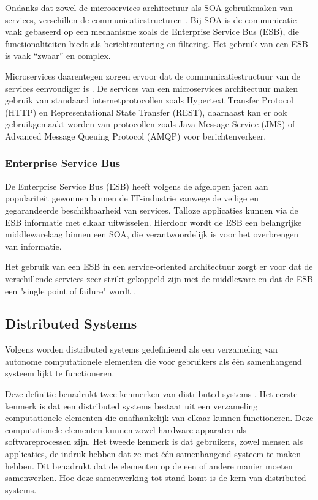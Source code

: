 Ondanks dat zowel de microservices architectuur als SOA gebruikmaken van services, verschillen de communicatiestructuren \autocite{Blinowski2022}. Bij SOA is de communicatie vaak gebaseerd op een mechanisme zoals de Enterprise Service Bus (ESB), die functionaliteiten biedt als berichtroutering en filtering. Het gebruik van een ESB is vaak ``zwaar'' en complex. 

Microservices daarentegen zorgen ervoor dat de communicatiestructuur van de services eenvoudiger is \autocite{Blinowski2022}. De services van een microservices architectuur maken gebruik van standaard internetprotocollen zoals Hypertext Transfer Protocol (HTTP) en Representational State Transfer (REST), daarnaast kan er ook gebruikgemaakt worden van protocollen zoals Java Message Service (JMS) of Advanced Message Queuing Protocol (AMQP) voor berichtenverkeer.

\subsubsection{Enterprise Service Bus}

De Enterprise Service Bus (ESB) heeft volgens \textcite{Aziz2020} de afgelopen jaren aan populariteit gewonnen binnen de IT-industrie vanwege de veilige en gegarandeerde beschikbaarheid van services. Talloze applicaties kunnen via de ESB informatie met elkaar uitwisselen. Hierdoor wordt de ESB een belangrijke middlewarelaag binnen een SOA, die verantwoordelijk is voor het overbrengen van informatie. 

Het gebruik van een ESB in een service-oriented architectuur zorgt er voor dat de verschillende services zeer strikt gekoppeld zijn met de middleware en dat de ESB een "single point of failure" wordt \autocite{Raj2021}.

\subsection{Distributed Systems}
\label{sec:dissys}

Volgens \textcite{Steen2018} worden distributed systems gedefinieerd als een verzameling van autonome computationele elementen die voor gebruikers als één samenhangend systeem lijkt te functioneren.

Deze definitie benadrukt twee kenmerken van distributed systems \autocite{Steen2018}. Het eerste kenmerk is dat een distributed systems bestaat uit een verzameling computationele elementen die onafhankelijk van elkaar kunnen functioneren. Deze computationele elementen kunnen zowel hardware-apparaten als softwareprocessen zijn. Het tweede kenmerk is dat gebruikers, zowel mensen als applicaties, de indruk hebben dat ze met één samenhangend systeem te maken hebben. Dit benadrukt dat de elementen op de een of andere manier moeten samenwerken. Hoe deze samenwerking tot stand komt is de kern van distributed systems.

